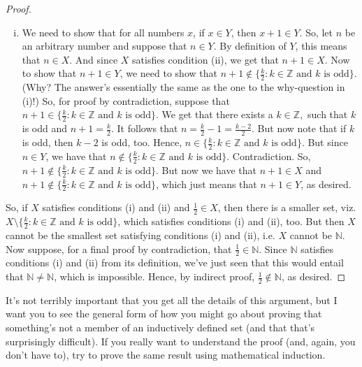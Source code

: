 \begin{enumerate}[{\thesection}.1]
\begin{proof}
\begin{enumerate}[(i)]
		\item We need to show that for all numbers $x$, if $x\in Y$, then $x+1\in Y$. So, let $n$ be an arbitrary number and suppose that $n\in Y$. By definition of $Y$, this means that $n\in X$. And since $X$ satisfies condition (ii), we get that $n+1\in X$. Now to show that $n+1\in Y$, we need to show that $n+1\notin   \{\frac{k}{2}: k\in \mathbb{Z}\text{ and }k\text{ is odd}\}$. (Why? The answer's essentially the same as the one to the why-question in (i)!) So, for proof by contradiction, suppose that $n+1\in \{\frac{k}{2}: k\in \mathbb{Z}\text{ and }k\text{ is odd}\}$. We get that there exists a $k\in \mathbb{Z},$ such that $k$ is odd and $n+1=\frac{k}{2}$.  It follows that $n=\frac{k}{2}-1=\frac{k-2}{2}$. But now note that if $k$ is odd, then $k-2$ is odd, too.  Hence, $n\in   \{\frac{k}{2}: k\in \mathbb{Z}\text{ and }k\text{ is odd}\}$.  But since $n\in Y$, we have that $n\notin   \{\frac{k}{2}: k\in \mathbb{Z}\text{ and }k\text{ is odd}\}$. Contradiction. So, $n+1\notin  \{\frac{k}{2}: k\in \mathbb{Z}\text{ and }k\text{ is odd}\}$. But now we have that $n+1\in X$ and $n+1\notin  \{\frac{k}{2}: k\in \mathbb{Z}\text{ and }k\text{ is odd}\}$, which just means that $n+1\in Y$, as desired.
		
	\end{enumerate}
		
		So, if $X$ satisfies conditions (i) and (ii) and $\frac{1}{2}\in X$, then there is a smaller set, viz. $X\setminus  \{\frac{k}{2}: k\in \mathbb{Z}\text{ and }k\text{ is odd}\}$, which satisfies conditions (i) and (ii), too. But then $X$ cannot be the smallest set satisfying conditions (i) and (ii), i.e. $X$ cannot be $\mathbb{N}$. Now suppose, for a final proof by contradiction, that $\frac{1}{2}\in\mathbb{N}$. Since $\mathbb{N}$ satisfies conditions (i) and (ii) from its definition,  we've just seen that this would entail that $\mathbb{N}\neq \mathbb{N}$, which is impossible. Hence, by indirect proof, $\frac{1}{2}\notin\mathbb{N}$, as desired.

		\end{proof}

It's not terribly important that you get all the details of this argument, but I want you to see the general form of how you might go about proving that something's not a member of an inductively defined set (and that that's surprisingly difficult). If you really want to understand the proof (and, again, you don't have to), try to prove the same result using mathematical induction.


\end{enumerate}
